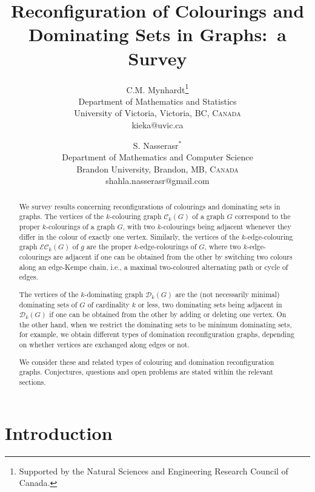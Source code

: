 \documentclass[12pt]{article}%
\begin{document}
\title{\textbf{Reconfiguration of Colourings and}\\\textbf{Dominating Sets in Graphs:\ a Survey}}
\author{C.M. Mynhardt\thanks{Supported by the Natural Sciences and Engineering
Research Council of Canada.}\\Department of Mathematics and Statistics\\University of Victoria, Victoria, BC, \textsc{Canada}\\{\small kieka@uvic.ca}
\and S. Nasserasr$^{\ast}$\\Department of Mathematics and Computer Science\\Brandon University, Brandon, MB, \textsc{Canada}\\{\small shahla.nasserasr@gmail.com}}
\date{}
\maketitle

\begin{abstract}
We survey results concerning reconfigurations of colourings and dominating
sets in graphs. The vertices of the $k$-colouring graph $\mathcal{C}_{k}(G)$
of a graph $G$ correspond to the proper $k$-colourings of a graph $G$, with
two $k$-colourings being adjacent whenever they differ in the colour of
exactly one vertex. Similarly, the vertices of the $k$-edge-colouring graph
$\mathcal{EC}_{k}(G)$ of $g$ are the proper $k$-edge-colourings of $G$, where
two $k$-edge-colourings are adjacent if one can be obtained from the other by
switching two colours along an edge-Kempe chain, i.e., a maximal two-coloured
alternating path or cycle of edges. 

The vertices of the $k$-dominating graph $\mathcal{D}_{k}(G)$ are the (not
necessarily minimal) dominating sets of $G$ of cardinality $k$ or less, two
dominating sets being adjacent in $\mathcal{D}_{k}(G)$ if one can be obtained
from the other by adding or deleting one vertex. On the other hand, when we
restrict the dominating sets to be minimum dominating sets, for example, we
obtain different types of domination reconfiguration graphs, depending on
whether vertices are exchanged along edges or not.

We consider these and related types of colouring and domination
reconfiguration graphs. Conjectures, questions and open problems are stated
within the relevant sections.

\end{abstract}

\section{Introduction}
\end{document}
